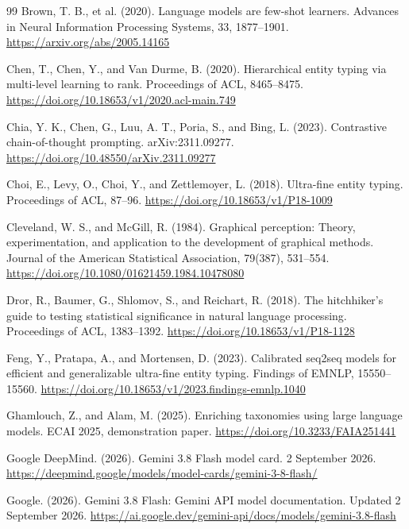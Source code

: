 \begin{thebibliography}{99}
Brown, T. B., et al. (2020). Language models are few-shot learners. Advances in Neural Information Processing Systems, 33, 1877–1901. \url{https://arxiv.org/abs/2005.14165}

Chen, T., Chen, Y., and Van Durme, B. (2020). Hierarchical entity typing via multi-level learning to rank. Proceedings of ACL, 8465–8475. \url{https://doi.org/10.18653/v1/2020.acl-main.749}

Chia, Y. K., Chen, G., Luu, A. T., Poria, S., and Bing, L. (2023). Contrastive chain-of-thought prompting. arXiv:2311.09277. \url{https://doi.org/10.48550/arXiv.2311.09277}

Choi, E., Levy, O., Choi, Y., and Zettlemoyer, L. (2018). Ultra-fine entity typing. Proceedings of ACL, 87–96. \url{https://doi.org/10.18653/v1/P18-1009}

Cleveland, W. S., and McGill, R. (1984). Graphical perception: Theory, experimentation, and application to the development of graphical methods. Journal of the American Statistical Association, 79(387), 531–554. \url{https://doi.org/10.1080/01621459.1984.10478080}

Dror, R., Baumer, G., Shlomov, S., and Reichart, R. (2018). The hitchhiker’s guide to testing statistical significance in natural language processing. Proceedings of ACL, 1383–1392. \url{https://doi.org/10.18653/v1/P18-1128}

Feng, Y., Pratapa, A., and Mortensen, D. (2023). Calibrated seq2seq models for efficient and generalizable ultra-fine entity typing. Findings of EMNLP, 15550–15560. \url{https://doi.org/10.18653/v1/2023.findings-emnlp.1040}

Ghamlouch, Z., and Alam, M. (2025). Enriching taxonomies using large language models. ECAI 2025, demonstration paper. \url{https://doi.org/10.3233/FAIA251441}

Google DeepMind. (2026). Gemini 3.8 Flash model card. 2 September 2026. \url{https://deepmind.google/models/model-cards/gemini-3-8-flash/}

Google. (2026). Gemini 3.8 Flash: Gemini API model documentation. Updated 2 September 2026. \url{https://ai.google.dev/gemini-api/docs/models/gemini-3.8-flash}


\end{thebibliography}
